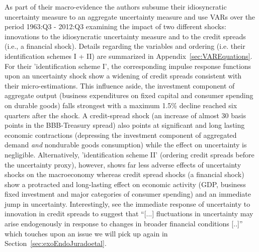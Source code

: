 \documentclass[a4paper,11pt,listof=nochaptergap,oneside,pointednumbers,bibtotoc,bigheadings,liststotoc,hidelinks]{scrbook}
\theoremstyle{mysatz}
\theoremstyle{mydefinition}
\theoremstyle{mytheorem}
\theoremstyle{mybemerkung}
\begin{document}
As part of their macro-evidence the authors subsume their idiosyncratic uncertainty measure to an aggregate uncertainty measure and use VARs over the period 1963:Q3 - 2012:Q3 examining the impact of two different shocks: innovations to the idiosyncratic uncertainty measure and to the credit spreads (i.e., a financial shock). Details regarding the variables and ordering (i.e. their identification schemes I + II) are summarized in Appendix~\ref{sec:VAREquations}. For their 'identification scheme I', the corresponding impulse response functions upon an uncertainty shock show a widening of credit spreads consistent with their micro-estimations. This influence aside, the investment component of aggregate output (business expenditures on fixed capital and consumer spending on durable goods) falls strongest with a maximum 1.5\% decline reached six quarters after the shock. A credit-spread shock (an increase of almost 30 basis points in the BBB-Treasury spread) also points at significant and long lasting economic contractions (depressing the investment component of aggregated demand \textit{and} nondurable goods consumption) while the effect on uncertainty is negligible. Alternatively, 'identification scheme II' (ordering credit spreads before the uncertainty proxy), however, shows far less adverse effects of uncertainty shocks on the macroeconomy whereas credit spread shocks (a financial shock) show a protracted and long-lasting effect on economic activity (GDP, business fixed investment and major categories of consumer spending) and an immediate jump in uncertainty. Interestingly, \citet[p. 14]{gilchristetal:14} see the immediate response of uncertainty to innovation in credit spreads to suggest that ``[...] fluctuations in uncertainty may arise endogenously in response to changes in broader financial conditions [..]'' which touches upon an issue we will pick up again in Section~\ref{sec:exoEndoJuradoetal}.\\
\end{document}
